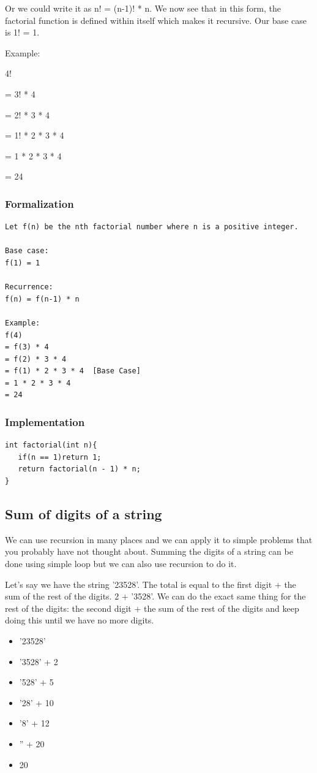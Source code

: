 \documentclass[11pt,oneside]{book}
\begin{document}
Or we could write it as n! = (n-1)! * n. We now see that in this form, the factorial function is defined within itself which makes it recursive. Our base case is 1! = 1.

Example:

4!

= 3! * 4

= 2! * 3 * 4

= 1! * 2 * 3 * 4

= 1 * 2 * 3 * 4

= 24

\subsubsection{Formalization}

\begin{lstlisting}
Let f(n) be the nth factorial number where n is a positive integer.

Base case:
f(1) = 1

Recurrence:
f(n) = f(n-1) * n

Example:
f(4) 
= f(3) * 4
= f(2) * 3 * 4
= f(1) * 2 * 3 * 4  [Base Case]
= 1 * 2 * 3 * 4
= 24
\end{lstlisting}

\subsubsection{Implementation}

\begin{lstlisting}
int factorial(int n){
   if(n == 1)return 1;
   return factorial(n - 1) * n;
}
\end{lstlisting}

\subsection{Sum of digits of a string}

We can use recursion in many places and we can apply it to simple problems that you probably have not thought about. Summing the digits of a string can be done using simple loop but we can also use recursion to do it.

Let's say we have the string '23528'. The total is equal to the first digit + the sum of the rest of the digits. 2 + '3528'. We can do the exact same thing for the rest of the digits: the second digit + the sum of the rest of the digits and keep doing this until we have no more digits.

\begin{itemize}
\item '23528'
\item '3528' + 2
\item '528' + 5
\item '28' + 10
\item '8' + 12
\item '' + 20
\item 20
\end{itemize}
\end{document}
